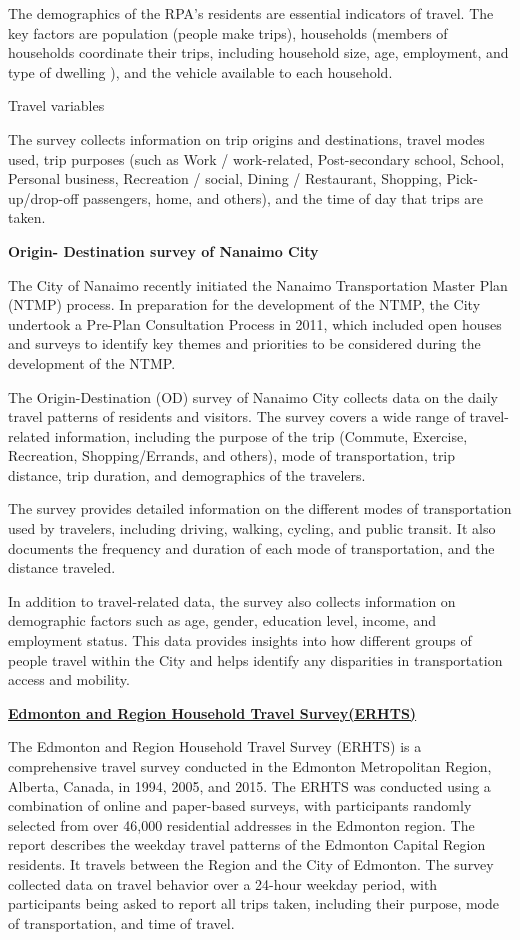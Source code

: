 \documentclass[
11pt, %
oneside, %
english, %
singlespacing, %
]{macthesis} %
\begin{document}
The demographics of the RPA's residents are essential indicators of travel. The key factors are population (people make trips), households (members of households coordinate their trips, including household size, age, employment, and type of dwelling ), and the vehicle available to each household.

Travel variables

The survey collects information on trip origins and destinations, travel modes used, trip purposes (such as Work / work-related, Post-secondary school, School, Personal business, Recreation / social, Dining / Restaurant, Shopping, Pick-up/drop-off passengers, home, and others), and the time of day that trips are taken.

\textbf{Origin- Destination survey of Nanaimo City}

The City of Nanaimo recently initiated the Nanaimo Transportation Master Plan (NTMP) process. In preparation for the development of the NTMP, the City undertook a Pre-Plan Consultation Process in 2011, which included open houses and surveys to identify key themes and priorities to be considered during the development of the NTMP.

The Origin-Destination (OD) survey of Nanaimo City collects data on the daily travel patterns of residents and visitors. The survey covers a wide range of travel-related information, including the purpose of the trip (Commute, Exercise, Recreation, Shopping/Errands, and others), mode of transportation, trip distance, trip duration, and demographics of the travelers.

The survey provides detailed information on the different modes of transportation used by travelers, including driving, walking, cycling, and public transit. It also documents the frequency and duration of each mode of transportation, and the distance traveled.

In addition to travel-related data, the survey also collects information on demographic factors such as age, gender, education level, income, and employment status. This data provides insights into how different groups of people travel within the City and helps identify any disparities in transportation access and mobility.

\textbf{\href{https://www.edmonton.ca/transportation/traffic_reports/travel-pattern-analysis}{Edmonton and Region Household Travel Survey(ERHTS)}}

The Edmonton and Region Household Travel Survey (ERHTS) is a comprehensive travel survey conducted in the Edmonton Metropolitan Region, Alberta, Canada, in 1994, 2005, and 2015. The ERHTS was conducted using a combination of online and paper-based surveys, with participants randomly selected from over 46,000 residential addresses in the Edmonton region. The report describes the weekday travel patterns of the Edmonton Capital Region residents. It travels between the Region and the City of Edmonton. The survey collected data on travel behavior over a 24-hour weekday period, with participants being asked to report all trips taken, including their purpose, mode of transportation, and time of travel.
\end{document}
